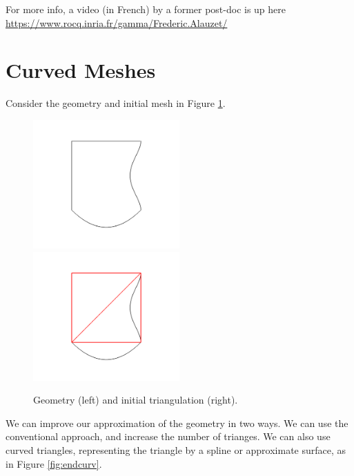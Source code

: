\documentclass[12pt]{article}
\begin{document}
For more info, a video (in French) by a former post-doc is up here
\url{https://www.rocq.inria.fr/gamma/Frederic.Alauzet/}

\section{Curved Meshes}
Consider the geometry and initial mesh in Figure \ref{fig:initcurv}.
\begin{figure}
\includegraphics[width=0.5\textwidth]{images/curvedgeom.png}
\includegraphics[width=0.5\textwidth]{images/curved1.png}
\caption{Geometry (left) and initial triangulation (right).}
\label{fig:initcurv}
\end{figure}
We can improve our approximation of the geometry in two ways. We can use the
conventional approach, and increase the number of trianges. We can also use
curved triangles, representing the triangle by a spline or approximate surface,
as in Figure \ref{fig:endcurv}.
\end{document}
